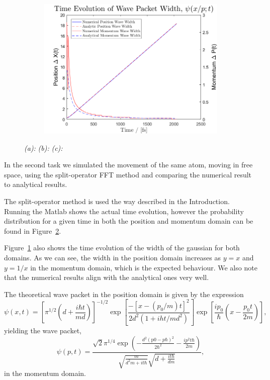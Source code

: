 \begin{figure}[H]
\begin{subfigure}[t]{0.7\textwidth}
\includegraphics[width=\textwidth]{graphics/task2/width_evolution.png}
\caption{}
\label{fig:2_c}
\end{subfigure}

\caption{
	\textit{(a):}  
	\textit{(b):} 
	\textit{(c):} 
}
\label{fig:2}
\end{figure}

In the second task we simulated the movement of the same atom, moving in free space, using the split-operator FFT method and comparing the numerical result to analytical results.

The split-operator method is used the way described in the Introduction. Running the Matlab shows the actual time evolution, however the probability distribution for a given time in both the position and momentum domain can be found in Figure~\ref{fig:2}.

Figure~\ref{fig:2_c} also shows the time evolution of the width of the gaussian for both domains. As we can see, the width in the position domain increases as $y = x$ and $y = 1/x$ in the momentum domain, which is the expected behaviour. We also note that the numerical results align with the analytical ones very well.

The theoretical wave packet in the position domain is given by the expression
\begin{equation}
\psi(x,t) = \left[
\pi^{1/2}\left(
d+\frac{i\hbar t}{md}
\right)
\right]^{-1/2}
\exp\left[
\frac{-\left[x-\left(p_0/m\right)t\right]^2}{2d^2(1+iht/md^2)}
\right]
\exp\left[
\frac{ip_0}{\hbar}\left(x-\frac{p_0t}{2m}\right)
\right],
\end{equation}
yielding the wave packet,
\begin{equation}
\psi(p,t) = \frac{\sqrt{2} \pi^{1/4} \exp \left(-\frac{d^2 (\text{p0}-p \hbar )^2}{2 \hbar ^2}-\frac{i p^2 t \hbar }{2 m}\right)}{\sqrt{\frac{m}{d^2 m+i t \hbar }} \sqrt{d+\frac{i t \hbar }{d m}}},
\end{equation}
in the momentum domain.



